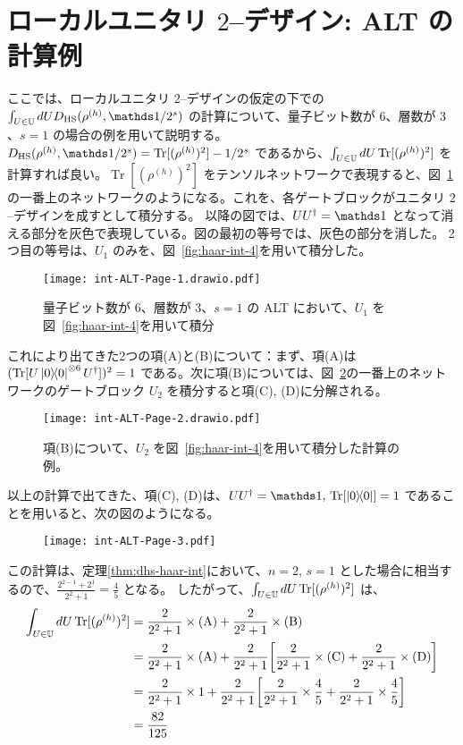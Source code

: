 \section{ローカルユニタリ $2$--デザイン: ALT の計算例}\label{sec:alt-calculation}
ここでは、ローカルユニタリ $2$--デザインの仮定の下での $\int_{U\in\bbU} dU D_{\HS} (\rho^{(h)} , \bbid/2^s)$ の計算について、量子ビット数が $6$、層数が $3$、$s = 1$ の場合の例を用いて説明する。
$D_{\HS} (\rho^{(h)} , \bbid/2^s) = \operatorname{Tr}[(\rho^{(h)})^2] - 1/2^s$ であるから、$\int_{U\in\mathbb{U}} dU \operatorname{Tr}[(\rho^{(h)})^2]$ を計算すれば良い。$\operatorname{Tr}[(\rho^{(h)})^2]$ をテンソルネットワークで表現すると、図~\ref{fig:tn-alt-int-1} の一番上のネットワークのようになる。これを、各ゲートブロックがユニタリ $2$--デザインを成すとして積分する。
以降の図では、$UU\dg = \bbid$ となって消える部分を灰色で表現している。図の最初の等号では、灰色の部分を消した。
2つ目の等号は、$U_1$ のみを、図~\ref{fig:haar-int-4}を用いて積分した。
\begin{figure}[H]
    \centering
    \texttt{[image: int-ALT-Page-1.drawio.pdf]}
    \vspace{-20pt}
    \caption{量子ビット数が $6$、層数が $3$、$s = 1$ の ALT において、$U_1$ を図~\ref{fig:haar-int-4}を用いて積分}
    \label{fig:tn-alt-int-1}
\end{figure}

これにより出てきた2つの項(A)と(B)について：まず、項(A)は $(\operatorname{Tr}[U\dyad{0}\otn{6}U\dg])^2 = 1$ である。次に項(B)については、図~\ref{fig:tn-alt-int-2}の一番上のネットワークのゲートブロック $U_2$ を積分すると項(C), (D)に分解される。
\begin{figure}[H]
    \centering
    \texttt{[image: int-ALT-Page-2.drawio.pdf]}
    \vspace{-20pt}
    \caption{項(B)について、$U_2$ を図~\ref{fig:haar-int-4}を用いて積分した計算の例。}
    \label{fig:tn-alt-int-2}
\end{figure}

以上の計算で出てきた、項(C), (D)は、$UU\dg = \bbid,\,\operatorname{Tr}[\dyad{0}] = 1$ であることを用いると、次の図のようになる。
\begin{figure}[H]
    \centering
    \texttt{[image: int-ALT-Page-3.pdf]}
    \label{fig:tn-alt-int-3}
\end{figure}
この計算は、定理\ref{thm:dhs-haar-int}において、$n = 2,\,s = 1$ とした場合に相当するので、$\frac{2^{2-1} + 2^1}{2^2 + 1} = \frac45$ となる。
したがって、$\int_{U\in\mathbb{U}} dU \operatorname{Tr}[(\rho^{(h)})^2]$ は、
\begin{align*}
    \int_{U\in\mathbb{U}} dU \operatorname{Tr}[(\rho^{(h)})^2]
    &= \frac{2}{2^2 + 1}\times\text{(A)} + \frac{2}{2^2 + 1}\times\text{(B)}\\
    &= \frac{2}{2^2 + 1}\times\text{(A)} + \frac{2}{2^2 + 1}\qty[\frac{2}{2^2 + 1}\times\text{(C)} + \frac{2}{2^2 + 1}\times\text{(D)}]\\
    &= \frac{2}{2^2 + 1}\times1 + \frac{2}{2^2 + 1}\qty[\frac{2}{2^2 + 1}\times\frac45 + \frac{2}{2^2 + 1}\times\frac45]\\
    &= \frac{82}{125}
\end{align*}
\restoregeometry

